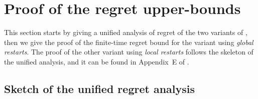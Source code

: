 

\section{Proof of the regret upper-bounds}
\label{sec:6:proofRegret}

This section starts by giving a unified analysis of regret of the two variants of \GLRklUCB, then we give the proof of the finite-time regret bound for the variant using \emph{global restarts}.
The proof of the other variant using \emph{local restarts} follows the skeleton of the unified analysis, and it can be found in Appendix~E of \cite{Besson2019GLRT}.

\subsection{Sketch of the unified regret analysis}
\label{sub:6:proofSkeleton}

